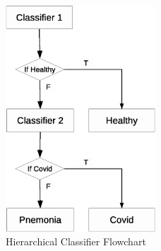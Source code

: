 \documentclass[12pt]{extarticle}
\begin{document}
	\begin{figure}[h]
		\centering
		\includegraphics[width=0.5\textwidth]{pics/Figures/GJU_H.eps}
		\caption{\small{Hierarchical Classifier Flowchart}}
		\label{fig:GJU}
	\end{figure}
	
\end{document}
